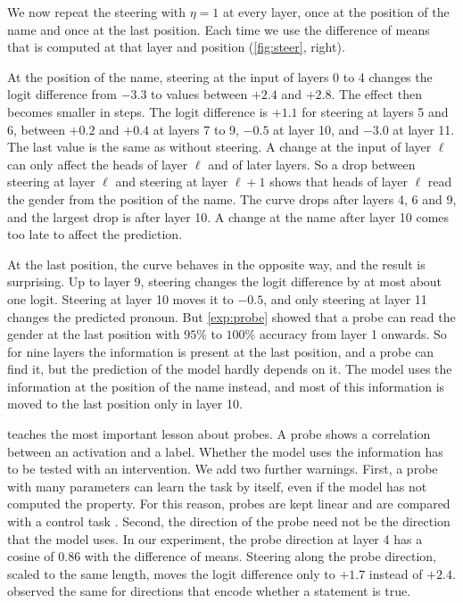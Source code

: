 \begin{experiment}\label{exp:decodable} 
We now repeat the steering with $\eta=1$ at every layer, once at the position of the name and once at the last
position. Each time we use the difference of means that is computed at that layer and position (\cref{fig:steer},
right).

At the position of the name, steering at the input of layers 0 to 4 changes the logit difference from $-3.3$ to
values between $+2.4$ and $+2.8$. The effect then becomes smaller in steps. The logit difference is $+1.1$ for
steering at layers 5 and 6, between $+0.2$ and $+0.4$ at layers 7 to 9, $-0.5$ at layer 10, and $-3.0$ at layer 11.
The last value is the same as without steering. A change at the input of layer $\ell$ can only affect the heads of
layer $\ell$ and of later layers. So a drop between steering at layer $\ell$ and steering at layer $\ell+1$ shows
that heads of layer $\ell$ read the gender from the position of the name. The curve drops after layers 4, 6 and 9,
and the largest drop is after layer 10. A change at the name after layer 10 comes too late to affect the
prediction.

At the last position, the curve behaves in the opposite way, and the result is surprising. Up to layer 9,
steering changes the logit difference by at most about one logit. Steering at layer 10 moves it to $-0.5$, and only
steering at layer 11 changes the predicted pronoun. But \cref{exp:probe} showed that a probe can read the gender at
the last position with $95\%$ to $100\%$ accuracy from layer 1 onwards. So for nine layers the information is
present at the last position, and a probe can find it, but the prediction of the model hardly depends on it. The
model uses the information at the position of the name instead, and most of this information is moved to the last
position only in layer 10.
\end{experiment}

\begin{caution}
 teaches the most important lesson about probes. A probe shows a correlation between an
activation and a label. Whether the model uses the information has to be tested with an intervention. We add two
further warnings. First, a probe with many parameters can learn the task by itself, even if the model has not
computed the property. For this reason, probes are kept linear and are compared with a control task
\citep{hewitt2019designing}. Second, the direction of the probe need not be the direction that the model uses. In
our experiment, the probe direction at layer 4 has a cosine of $0.86$ with the difference of means. Steering along
the probe direction, scaled to the same length, moves the logit difference only to $+1.7$ instead of $+2.4$.
\citet{marks2024geometry} observed the same for directions that encode whether a statement is true.
\end{caution}

